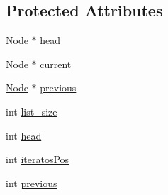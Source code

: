 \subsection*{Protected Attributes}
\begin{DoxyCompactItemize}
\item 
\hyperlink{struct_node}{Node} $\ast$ \hyperlink{class_linked_list_a2d1f848e19caa3f180b7fa6938125bba}{head}
\item 
\hyperlink{struct_node}{Node} $\ast$ \hyperlink{class_linked_list_ac31fae6ecb440b8d069790e5294f82fe}{current}
\item 
\hyperlink{struct_node}{Node} $\ast$ \hyperlink{class_linked_list_a3489a27822d31002e3ffeea44b402296}{previous}
\item 
int \hyperlink{class_linked_list_affff5ce490bbe41e4d1bcb21b846891c}{list\-\_\-size}
\item 
int \hyperlink{class_linked_list_a2e6a6b5a560b362c8f03cca2183c2710}{head}
\item 
int \hyperlink{class_linked_list_ae6821bb450a08c7e918e477b747667c1}{iteratos\-Pos}
\item 
int \hyperlink{class_linked_list_ad8fb5d6184b9d23087bd4916722ee3ae}{previous}
\end{DoxyCompactItemize}


